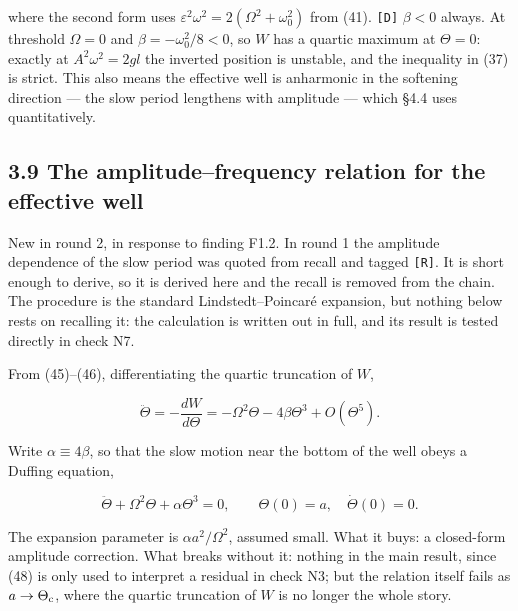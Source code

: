 \documentclass[11pt,a4paper]{article}
\newcommand{\tagmark}[1]{\marginnote{\scriptsize\ttfamily #1}}
\newcommand{\Atag}{\tagmark{[A]}}   %
\providecommand{\passthrough}[1]{#1}
\begin{document}
where the second form uses \(\varepsilon^2\omega^2=2(\Omega^2+\omega_0^2)\) from
(41). \passthrough{\lstinline![D]!} \(\beta<0\) always. At threshold \(\Omega=0\) and
\(\beta=-\omega_0^2/8<0\), so \(W\) has a quartic maximum at \(\Theta=0\): exactly
at \(A^2\omega^2=2gl\) the inverted position is unstable, and the inequality in
(37) is strict. This also means the effective well is anharmonic in the softening
direction --- the slow period lengthens with amplitude --- which §4.4 uses
quantitatively.

\hypertarget{the-amplitudefrequency-relation-for-the-effective-well}{%
\subsection{3.9 The amplitude--frequency relation for the effective well}\label{the-amplitudefrequency-relation-for-the-effective-well}}

New in round 2, in response to finding F1.2. In round 1 the amplitude dependence
of the slow period was quoted from recall and tagged \passthrough{\lstinline![R]!}. It is short enough
to derive, so it is derived here and the recall is removed from the chain. The
procedure is the standard Lindstedt--Poincaré expansion, but nothing below rests
on recalling it: the calculation is written out in full, and its result is
tested directly in check N7.

From (45)--(46), differentiating the quartic truncation of \(W\),

\begin{equation}
\ddot\Theta = -\frac{dW}{d\Theta}
  = -\Omega^2\Theta - 4\beta\Theta^3 + O(\Theta^5). \tag{47}
\end{equation}

Write \(\alpha\equiv4\beta\), so that the slow motion near the bottom of the well
obeys a Duffing equation,

\begin{equation}
\ddot\Theta + \Omega^2\Theta + \alpha\Theta^3 = 0,
  \qquad \Theta(0)=a,\quad \dot\Theta(0)=0. \tag{48}
\end{equation}

\Atag{} The expansion parameter is \(\alpha a^2/\Omega^2\), assumed small. What it
buys: a closed-form amplitude correction. What breaks without it: nothing in the
main result, since (48) is only used to interpret a residual in check N3; but
the relation itself fails as \(a\to\Theta_{\rm c}\), where the quartic truncation
of \(W\) is no longer the whole story.
\end{document}
